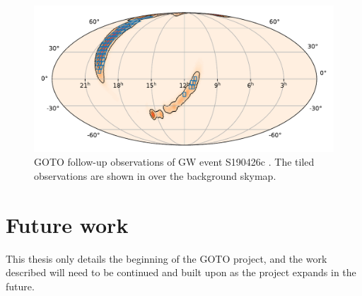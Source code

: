 \begin{colsection}
\begin{figure}[p]
    \begin{center}
        \includegraphics[width=0.9\linewidth]{images/190426_goto.pdf}
    \end{center}
    \caption[Follow-up observations of S190426c with GOTO]{
        GOTO follow-up observations of GW event S190426c \citep{S190426c_GOTO}. The tiled observations are shown in  over the background skymap.
        }\label{fig:190426_goto}
\end{figure}

\clearpage

\end{colsection}


\section{Future work}
\label{sec:future}


\begin{colsection}

This thesis only details the beginning of the GOTO project, and the work described will need to be continued and built upon as the project expands in the future.

\end{colsection}


